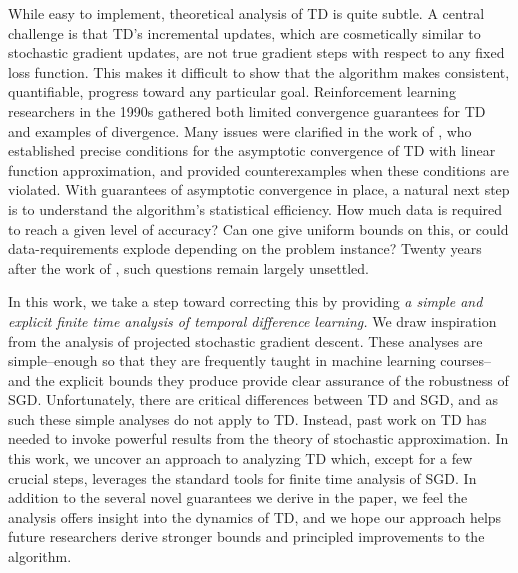 \documentclass[final,12pt]{colt2018} %
\begin{document}
While easy to implement,  theoretical analysis of TD is quite subtle. A central challenge is that TD’s incremental updates, which are cosmetically similar to stochastic gradient updates, are not true gradient steps with respect to any fixed loss function. This makes it difficult to show that the algorithm makes consistent, quantifiable, progress toward any particular goal. Reinforcement learning researchers in the 1990s gathered both limited convergence guarantees for TD and examples of divergence. Many issues were clarified in the work of \cite{tsitsiklis1997analysis}, who established precise conditions for the asymptotic convergence of TD with linear function approximation, and provided counterexamples when these conditions are violated.  With guarantees of asymptotic convergence in place, a natural next step is to understand the algorithm's statistical efficiency. How much data is required to reach a given level of accuracy? Can one give uniform bounds on this, or could data-requirements explode depending on the problem instance? Twenty years after the work of \cite{tsitsiklis1997analysis}, such questions remain largely unsettled. 

In this work, we take a step toward correcting this by providing \emph{a simple and explicit finite time analysis of temporal difference learning.}  We draw inspiration from the analysis of projected stochastic gradient descent. These analyses are simple--enough so that they are frequently taught in machine learning courses--and the explicit bounds they produce provide clear assurance of the robustness of SGD. Unfortunately, there are critical differences between TD and SGD, and as such these simple analyses do not apply to TD. Instead, past work on TD has needed to invoke powerful results from the theory of stochastic approximation. In this work, we uncover an approach to analyzing TD which, except for a few crucial steps, leverages the standard tools for finite time analysis of SGD. In addition to the several novel guarantees we derive in the paper, we feel the analysis offers insight into the dynamics of TD, and we hope our approach helps future researchers derive stronger bounds and principled improvements to the algorithm. 



\end{document}
